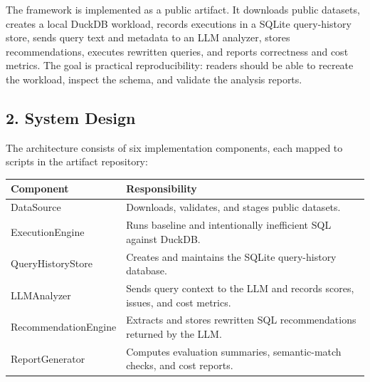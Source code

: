 The framework is implemented as a public artifact. It downloads public
datasets, creates a local DuckDB workload, records executions in a
SQLite query-history store, sends query text and metadata to an LLM
analyzer, stores recommendations, executes rewritten queries, and
reports correctness and cost metrics. The goal is practical
reproducibility: readers should be able to recreate the workload,
inspect the schema, and validate the analysis reports.

\subsection{2. System Design}\label{system-design}

The architecture consists of six implementation components, each mapped
to scripts in the artifact repository:

\begin{Shaded}
\begin{Highlighting}[]
\end{Highlighting}
\end{Shaded}

{\def\LTcaptype{none} %
\begin{longtable}[]{@{}
  >{\raggedright\arraybackslash}p{}
  >{\raggedright\arraybackslash}p{}@{}}
\toprule\noalign{}
\begin{minipage}[b]{\linewidth}\raggedright
Component
\end{minipage} & \begin{minipage}[b]{\linewidth}\raggedright
Responsibility
\end{minipage} \\
\midrule\noalign{}
\endhead
\bottomrule\noalign{}
\endlastfoot
DataSource & Downloads, validates, and stages public datasets. \\
ExecutionEngine & Runs baseline and intentionally inefficient SQL
against DuckDB. \\
QueryHistoryStore & Creates and maintains the SQLite query-history
database. \\
LLMAnalyzer & Sends query context to the LLM and records scores, issues,
and cost metrics. \\
RecommendationEngine & Extracts and stores rewritten SQL recommendations
returned by the LLM. \\
ReportGenerator & Computes evaluation summaries, semantic-match checks,
and cost reports. \\
\end{longtable}
}

